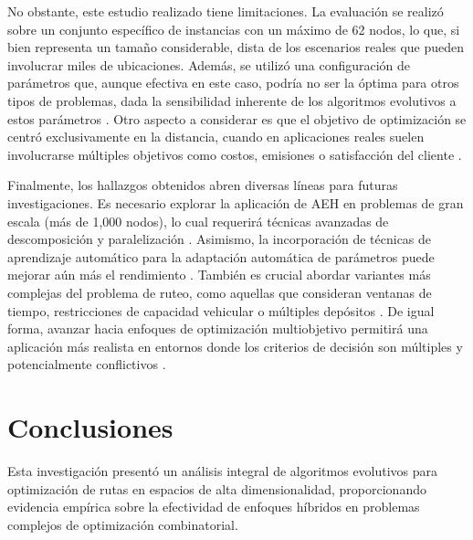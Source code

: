 \documentclass[conference]{IEEEtran}
\begin{document}
No obstante, este estudio realizado tiene limitaciones. La evaluación se realizó sobre un conjunto específico de instancias con un máximo de 62 nodos, lo que, si bien representa un tamaño considerable, dista de los escenarios reales que pueden involucrar miles de ubicaciones. Además, se utilizó una configuración de parámetros que, aunque efectiva en este caso, podría no ser la óptima para otros tipos de problemas, dada la sensibilidad inherente de los algoritmos evolutivos a estos parámetros \cite{das2011}. Otro aspecto a considerar es que el objetivo de optimización se centró exclusivamente en la distancia, cuando en aplicaciones reales suelen involucrarse múltiples objetivos como costos, emisiones o satisfacción del cliente \cite{coello2007}.


Finalmente, los hallazgos obtenidos abren diversas líneas para futuras investigaciones. Es necesario explorar la aplicación de AEH en problemas de gran escala (más de 1,000 nodos), lo cual requerirá técnicas avanzadas de descomposición y paralelización \cite{alba2013}. Asimismo, la incorporación de técnicas de aprendizaje automático para la adaptación automática de parámetros puede mejorar aún más el rendimiento \cite{jin2011}. También es crucial abordar variantes más complejas del problema de ruteo, como aquellas que consideran ventanas de tiempo, restricciones de capacidad vehicular o múltiples depósitos \cite{toth2014}. De igual forma, avanzar hacia enfoques de optimización multiobjetivo permitirá una aplicación más realista en entornos donde los criterios de decisión son múltiples y potencialmente conflictivos \cite{coello2007}.





\section{Conclusiones}

Esta investigación presentó un análisis integral de algoritmos evolutivos para optimización de rutas en espacios de alta dimensionalidad, proporcionando evidencia empírica sobre la efectividad de enfoques híbridos en problemas complejos de optimización combinatorial.
\end{document}
